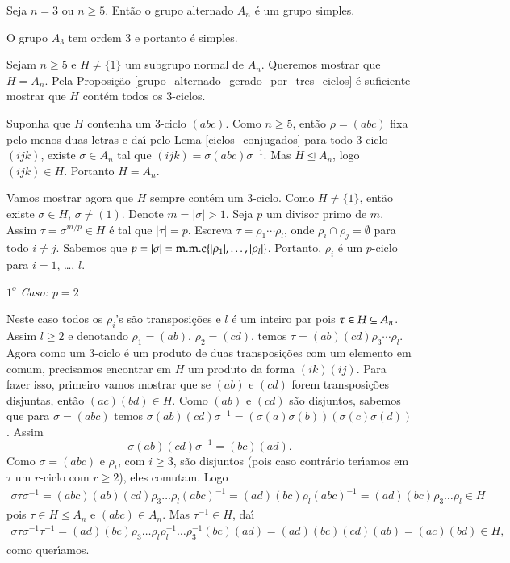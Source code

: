 \begin{teorema}
	Seja $n = 3$ ou $n \ge 5$. Ent\~ao o grupo alternado $A_n$ \'e um grupo simples.
\end{teorema}
\begin{prova}
	O grupo $A_3$ tem ordem 3 e portanto \'e simples.

	Sejam $n \ge 5$ e $H \ne \{1\}$ um subgrupo normal de $A_n$. Queremos mostrar que $H = A_n$. Pela Proposi\c{c}\~ao \ref{grupo_alternado_gerado_por_tres_ciclos} \'e suficiente mostrar que $H$ cont\'em todos os 3-ciclos.

	Suponha que $H$ contenha um 3-ciclo $(a b c)$. Como $n \ge 5$, ent\~ao $\rho = (a b c)$ fixa pelo menos duas letras e da{\'\i} pelo Lema \ref{ciclos_conjugados} para todo 3-ciclo $(i j k)$, existe $\sigma \in A_n$ tal que $(i j k) = \sigma (a b c) \sigma^{-1}$. Mas $H \unlhd A_n$, logo $(i j k) \in H$. Portanto $H = A_n$.

	Vamos mostrar agora que $H$ sempre cont\'em um 3-ciclo. Como $H \ne \{1\}$, ent\~ao existe $\sigma \in H$, $\sigma \ne (1)$. Denote $m = |\sigma| > 1$. Seja $p$ um divisor primo de $m$. Assim $\tau = \sigma^{m/p} \in H$ \'e tal que $|\tau| = p$. Escreva $\tau = \rho_1\cdots\rho_l$, onde $\rho_i \cap \rho_j = \emptyset$ para todo $i \ne j$. Sabemos que $p = |\sigma| = {\rm m.m.c}\{|\rho_1|,\dots, |\rho_l|\}$. Portanto, $\rho_i$ \'e um $p$-ciclo para $i = 1$, \dots, $l$.
	
	\textit{$1^o$ Caso: $p = 2$}

	Neste caso todos os $\rho_i$'s s\~ao transposi\c{c}\~oes e $l$ \'e um inteiro par pois $\tau \in H \subseteq A_n$. Assim $l \ge 2$ e denotando $\rho_1 = (a b)$, $\rho_2 = (c d)$, temos $\tau = (a b)(c d)\rho_3\cdots\rho_l$. Agora como um 3-ciclo \'e um produto de duas transposi\c{c}\~oes com um elemento em comum, precisamos encontrar em $H$ um produto da forma $(i k)(i j)$. Para fazer isso, primeiro vamos mostrar que se $(a b)$ e $(c d)$ forem transposi\c{c}\~oes disjuntas, ent\~ao $(a c)(b d) \in H$. Como $(a b)$ e $(c d)$ s\~ao disjuntos, sabemos que para $\sigma = (a b c)$ temos $\sigma (a b)(c d)\sigma^{-1} = (\sigma(a) \sigma(b))(\sigma(c) \sigma(d))$. Assim
	\[
		\sigma(a b)(c d)\sigma^{-1} = (b c)(a d).
	\]
	Como $\sigma = (a b c)$ e $\rho_i$, com $i \ge 3$, s\~ao disjuntos (pois caso contr\'ario ter{\'\i}amos em $\tau$ um $r$-ciclo com $r \ge 2$), eles comutam. Logo
	\begin{align*}
		\sigma\tau\sigma^{-1} = (a b c)(a b)(c d)\rho_3\dots\rho_l (a b c)^{-1} = (a d)(b c)\rho_l(a b c)^{-1} = (a d)(b c)\rho_3\dots\rho_l \in H
	\end{align*}
	pois $\tau \in H \unlhd A_n$ e $(a b c) \in A_n$. Mas $\tau^{-1} \in H$, da{\'\i}
	\begin{align*}
		\sigma\tau\sigma^{-1}\tau^{-1} = (a d)(b c)\rho_3\dots\rho_l\rho_l^{-1}\dots\rho_3^{-1}(b c)(a d) = (a d)(b c)(c d)(a b) = (a c)(b d) \in H,
	\end{align*}
	como quer{\'\i}amos.


\end{prova}

